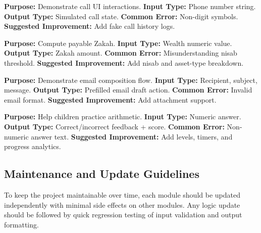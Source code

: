 \documentclass{article}
\begin{document}
\begin{featurebox}
\textbf{Purpose:} Demonstrate call UI interactions.\newline
\textbf{Input Type:} Phone number string.\newline
\textbf{Output Type:} Simulated call state.\newline
\textbf{Common Error:} Non-digit symbols.\newline
\textbf{Suggested Improvement:} Add fake call history logs.
\end{featurebox}

\begin{featurebox}
\textbf{Purpose:} Compute payable Zakah.\newline
\textbf{Input Type:} Wealth numeric value.\newline
\textbf{Output Type:} Zakah amount.\newline
\textbf{Common Error:} Misunderstanding nisab threshold.\newline
\textbf{Suggested Improvement:} Add nisab and asset-type breakdown.
\end{featurebox}

\begin{featurebox}
\textbf{Purpose:} Demonstrate email composition flow.\newline
\textbf{Input Type:} Recipient, subject, message.\newline
\textbf{Output Type:} Prefilled email draft action.\newline
\textbf{Common Error:} Invalid email format.\newline
\textbf{Suggested Improvement:} Add attachment support.
\end{featurebox}

\begin{featurebox}
\textbf{Purpose:} Help children practice arithmetic.\newline
\textbf{Input Type:} Numeric answer.\newline
\textbf{Output Type:} Correct/incorrect feedback + score.\newline
\textbf{Common Error:} Non-numeric answer text.\newline
\textbf{Suggested Improvement:} Add levels, timers, and progress analytics.
\end{featurebox}

\subsection{Maintenance and Update Guidelines}
To keep the project maintainable over time, each module should be updated independently with minimal side effects on other modules. Any logic update should be followed by quick regression testing of input validation and output formatting.
\end{document}
